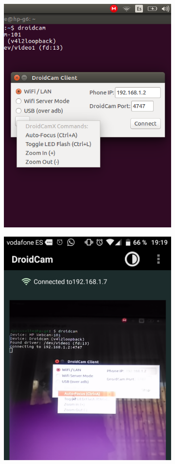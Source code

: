 \begin{figure}
\begin{subfigure}{0.33\textwidth}
		\includegraphics[width=0.9\linewidth]{figures/droidcamlinux.png}
		\caption{}
	\end{subfigure}%
	\begin{subfigure}{0.33\textwidth}
		\centering
		\includegraphics[width=0.9\linewidth]{figures/droidcampost.png}

\end{subfigure}
\end{figure}
